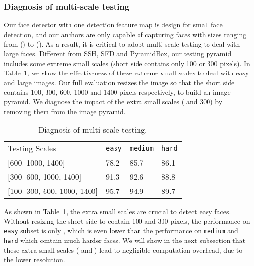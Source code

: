 \documentclass[10pt,twocolumn,letterpaper]{article}
\begin{document}
\subsubsection*{Diagnosis of multi-scale testing}
Our face detector with one detection feature map is design for small face detection, and our anchors
are only capable of capturing faces with sizes ranging from () to
(). As a result, it is critical to adopt multi-scale testing to deal with large faces.
Different from SSH, SFD and PyramidBox, our testing pyramid includes some extreme
small scales (\ie short side contains only 100 or 300 pixels). In Table~\ref{tbl:scale},
we show the effectiveness of these extreme small scales to deal with easy and large images.
Our full evaluation resizes the image so that the short side contains 100, 300, 600, 1000
and 1400 pixels respectively, to build an image pyramid. We diagnose the impact of the
extra small scales ( and 300) by removing them from the image pyramid.

\begin{table}[ht]
\centering
\begin{tabular}{|l|l|l|l|}
\hline
Testing Scales                  & \texttt{easy}& \texttt{medium} & \texttt{hard} \\ \hhline{|=|=|=|=|}
{[}600, 1000, 1400{]}           & 78.2     & 85.7      & 86.1     \\ \hline
{[}300, 600, 1000, 1400{]}      & 91.3     & 92.6      & 88.8     \\ \hline
{[}100, 300, 600, 1000, 1400{]} & 95.7 & 94.9  & 89.7 \\ \hline
\end{tabular}
\caption{Diagnosis of multi-scale testing.\label{tbl:scale}}
\end{table}

As shown in Table~\ref{tbl:scale}, the extra small scales are crucial to detect
easy faces. Without resizing the short side to contain 100 and 300 pixels, the performance
on \texttt{easy} subset is only , which is even lower than the performance on \texttt{medium}
and \texttt{hard} which contain much harder faces. We will show in the next subsection that
these extra small scales ( and ) lead to negligible computation overhead, due to the
lower resolution.
\end{document}
